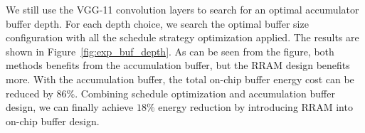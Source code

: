 

We still use the VGG-11 convolution layers to search for an optimal accumulator buffer depth. For each depth choice, we search the optimal buffer size configuration with all the schedule strategy optimization applied. The results are shown in Figure~\ref{fig:exp_buf_depth}. As can be seen from the figure, both methods benefits from the accumulation buffer, but the RRAM design benefits more. With the accumulation buffer, the total on-chip buffer energy cost can be reduced by $86\%$. Combining schedule optimization and accumulation buffer design, we can finally achieve $18\%$ energy reduction by introducing RRAM into on-chip buffer design.